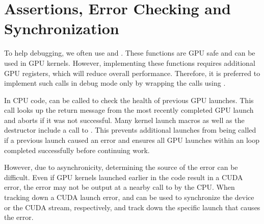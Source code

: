 \documentclass[letterpaper,10pt,english]{sphinxmanual}
\begin{document}
\section{Assertions, Error Checking and Synchronization}
\label{\detokenize{GPU:assertions-error-checking-and-synchronization}}\label{\detokenize{GPU:sec-gpu-assertion}}
\sphinxAtStartPar
To help debugging, we often use  and
.  These functions are GPU safe and can be used in
GPU kernels.  However, implementing these functions requires additional
GPU registers, which will reduce overall performance.  Therefore, it
is preferred to implement such calls in debug mode only by wrapping the
calls using .

\sphinxAtStartPar
In CPU code,  can be called
to check the health of previous GPU launches.  This call
looks up the return message from the most recently completed GPU
launch and aborts if it was not successful. Many kernel
launch macros as well as the  destructor include a call
to . This prevents additional launches
from being called if a previous launch caused an error and ensures
all GPU launches within an  loop completed successfully
before continuing work.

\sphinxAtStartPar
However, due to asynchronicity, determining the source of the error
can be difficult.  Even if GPU kernels launched earlier in the code
result in a CUDA error, the error may not be output at a nearby call to
 by the CPU.  When tracking down a CUDA
launch error,  and
 can be used to synchronize
the device or the CUDA stream, respectively, and track down the specific
launch that causes the error.
\end{document}
